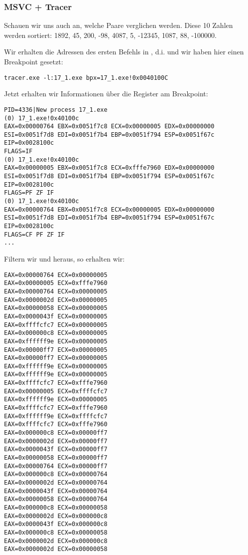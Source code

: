 

\subsubsection{MSVC + Tracer}
Schauen wir uns auch an, welche Paare verglichen werden.
Diese 10 Zahlen werden sortiert: 
1892, 45, 200, -98, 4087, 5, -12345, 1087, 88, -100000.

Wir erhalten die Adressen des ersten \CMP Befehls in \comp, d.i.  und wir haben hier einen Breakpoint
gesetzt:

\begin{lstlisting}
tracer.exe -l:17_1.exe bpx=17_1.exe!0x0040100C
\end{lstlisting}

Jetzt erhalten wir Informationen über die Register am Breakpoint:

\begin{lstlisting}
PID=4336|New process 17_1.exe
(0) 17_1.exe!0x40100c
EAX=0x00000764 EBX=0x0051f7c8 ECX=0x00000005 EDX=0x00000000
ESI=0x0051f7d8 EDI=0x0051f7b4 EBP=0x0051f794 ESP=0x0051f67c
EIP=0x0028100c
FLAGS=IF
(0) 17_1.exe!0x40100c
EAX=0x00000005 EBX=0x0051f7c8 ECX=0xfffe7960 EDX=0x00000000
ESI=0x0051f7d8 EDI=0x0051f7b4 EBP=0x0051f794 ESP=0x0051f67c
EIP=0x0028100c
FLAGS=PF ZF IF
(0) 17_1.exe!0x40100c
EAX=0x00000764 EBX=0x0051f7c8 ECX=0x00000005 EDX=0x00000000
ESI=0x0051f7d8 EDI=0x0051f7b4 EBP=0x0051f794 ESP=0x0051f67c
EIP=0x0028100c
FLAGS=CF PF ZF IF
...
\end{lstlisting}

Filtern wir  und  heraus, so erhalten wir:

\begin{lstlisting}
EAX=0x00000764 ECX=0x00000005
EAX=0x00000005 ECX=0xfffe7960
EAX=0x00000764 ECX=0x00000005
EAX=0x0000002d ECX=0x00000005
EAX=0x00000058 ECX=0x00000005
EAX=0x0000043f ECX=0x00000005
EAX=0xffffcfc7 ECX=0x00000005
EAX=0x000000c8 ECX=0x00000005
EAX=0xffffff9e ECX=0x00000005
EAX=0x00000ff7 ECX=0x00000005
EAX=0x00000ff7 ECX=0x00000005
EAX=0xffffff9e ECX=0x00000005
EAX=0xffffff9e ECX=0x00000005
EAX=0xffffcfc7 ECX=0xfffe7960
EAX=0x00000005 ECX=0xffffcfc7
EAX=0xffffff9e ECX=0x00000005
EAX=0xffffcfc7 ECX=0xfffe7960
EAX=0xffffff9e ECX=0xffffcfc7
EAX=0xffffcfc7 ECX=0xfffe7960
EAX=0x000000c8 ECX=0x00000ff7
EAX=0x0000002d ECX=0x00000ff7
EAX=0x0000043f ECX=0x00000ff7
EAX=0x00000058 ECX=0x00000ff7
EAX=0x00000764 ECX=0x00000ff7
EAX=0x000000c8 ECX=0x00000764
EAX=0x0000002d ECX=0x00000764
EAX=0x0000043f ECX=0x00000764
EAX=0x00000058 ECX=0x00000764
EAX=0x000000c8 ECX=0x00000058
EAX=0x0000002d ECX=0x000000c8
EAX=0x0000043f ECX=0x000000c8
EAX=0x000000c8 ECX=0x00000058
EAX=0x0000002d ECX=0x000000c8
EAX=0x0000002d ECX=0x00000058
\end{lstlisting}

